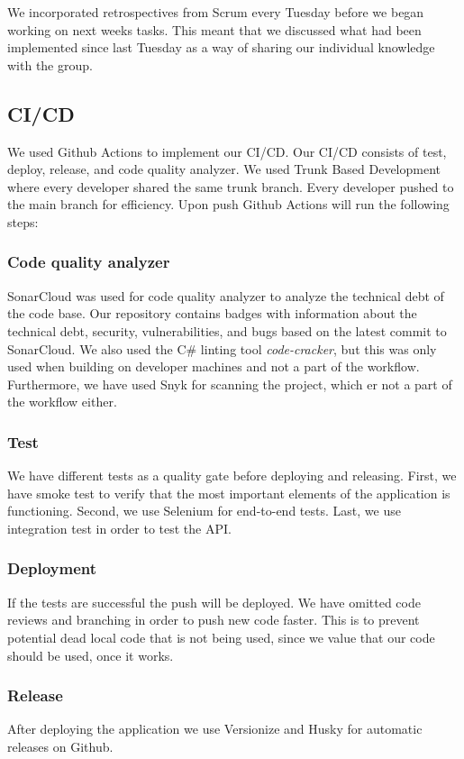 We incorporated retrospectives from Scrum every Tuesday before we began working on next weeks tasks. This meant that we discussed what had been implemented since last Tuesday as a way of sharing our individual knowledge with the group.

\subsection{CI/CD}
We used Github Actions to implement our CI/CD. Our CI/CD consists of test, deploy, release, and code quality analyzer. We used Trunk Based Development where every developer shared the same trunk branch. Every developer pushed to the main branch for efficiency. Upon push Github Actions will run the following steps:

\subsubsection{Code quality analyzer}
SonarCloud was used for code quality analyzer to analyze the technical debt of the code base. Our repository contains badges with information about the technical debt, security, vulnerabilities, and bugs based on the latest commit to SonarCloud. We also used the C\# linting tool \textit{code-cracker}, but this was only used when building on developer machines and not a part of the workflow. Furthermore, we have used Snyk for scanning the project, which er not a part of the workflow either.

\subsubsection{Test}
We have different tests as a quality gate before deploying and releasing. First, we have smoke test to verify that the most important elements of the application is functioning. Second, we use Selenium for end-to-end tests. Last, we use integration test in order to test the API.

\subsubsection{Deployment}
If the tests are successful the push will be deployed. We have omitted code reviews and branching in order to push new code faster. This is to prevent potential dead local code that is not being used, since we value that our code should be used, once it works.

\subsubsection{Release}
After deploying the application we use Versionize and Husky for automatic releases on Github.

